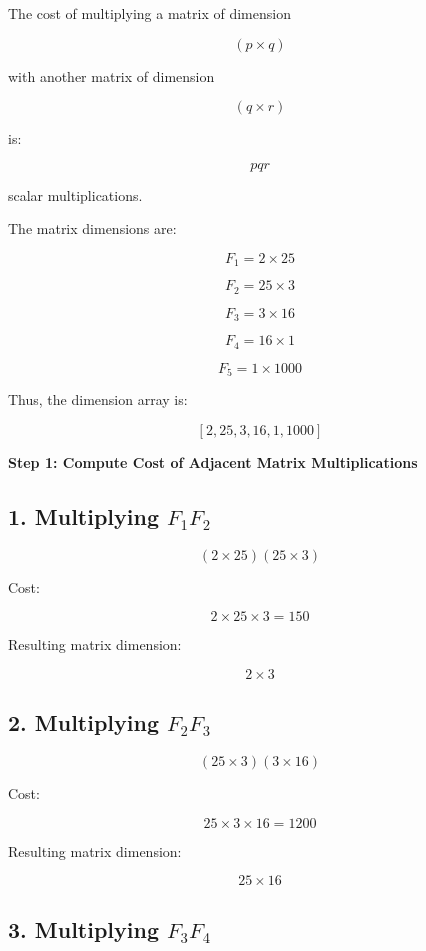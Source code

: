 \documentclass[12pt]{article}
\begin{document}
The cost of multiplying a matrix of dimension

\[
(p \times q)
\]

with another matrix of dimension

\[
(q \times r)
\]

is:

\[
pqr
\]

scalar multiplications.

\vspace{0.3cm}

The matrix dimensions are:

\[
F_1 = 2 \times 25
\]

\[
F_2 = 25 \times 3
\]

\[
F_3 = 3 \times 16
\]

\[
F_4 = 16 \times 1
\]

\[
F_5 = 1 \times 1000
\]

Thus, the dimension array is:

\[
[2,25,3,16,1,1000]
\]

\vspace{0.5cm}

\textbf{Step 1: Compute Cost of Adjacent Matrix Multiplications}

\subsection*{1. Multiplying $F_1F_2$}

\[
(2 \times 25)(25 \times 3)
\]

Cost:

\[
2 \times 25 \times 3 = 150
\]

Resulting matrix dimension:

\[
2 \times 3
\]

\vspace{0.3cm}

\subsection*{2. Multiplying $F_2F_3$}

\[
(25 \times 3)(3 \times 16)
\]

Cost:

\[
25 \times 3 \times 16 = 1200
\]

Resulting matrix dimension:

\[
25 \times 16
\]

\vspace{0.3cm}

\subsection*{3. Multiplying $F_3F_4$}
\end{document}
